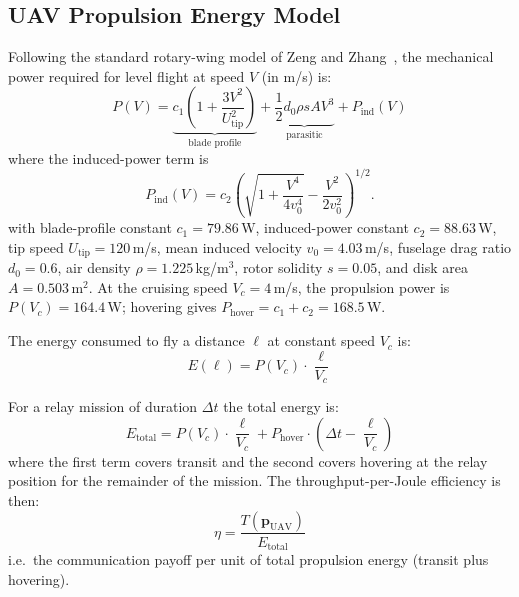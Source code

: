 \documentclass[journal]{IEEEtran}
\begin{document}
\subsection{UAV Propulsion Energy Model}

Following the standard rotary-wing model of Zeng and Zhang~\cite{zeng2017energy}, the mechanical power required for level flight at speed $V$ (in m/s) is:
\begin{equation}
    P(V) = \underbrace{c_1\!\left(1 + \frac{3V^2}{U_\text{tip}^2}\right)}_{\text{blade profile}} + \underbrace{\frac{1}{2}d_0 \rho s A V^3}_{\text{parasitic}} + P_\text{ind}(V)
    \label{eq:propulsion}
\end{equation}
where the induced-power term is
\begin{equation}
    P_\text{ind}(V) = c_2\!\left(\sqrt{1 + \frac{V^4}{4v_0^4}} - \frac{V^2}{2v_0^2}\right)^{\!1/2}.
    \label{eq:induced}
\end{equation}
with blade-profile constant $c_1 = 79.86$\,W, induced-power constant $c_2 = 88.63$\,W, tip speed $U_\text{tip} = 120$\,m/s, mean induced velocity $v_0 = 4.03$\,m/s, fuselage drag ratio $d_0 = 0.6$, air density $\rho = 1.225$\,kg/m$^3$, rotor solidity $s = 0.05$, and disk area $A = 0.503$\,m$^2$. At the cruising speed $V_c = 4$\,m/s, the propulsion power is $P(V_c) = 164.4$\,W; hovering gives $P_\text{hover} = c_1 + c_2 = 168.5$\,W.

The energy consumed to fly a distance $\ell$ at constant speed $V_c$ is:
\begin{equation}
    E(\ell) = P(V_c) \cdot \frac{\ell}{V_c}
    \label{eq:energy}
\end{equation}

For a relay mission of duration $\Delta t$ the total energy is:
\begin{equation}
    E_\text{total} = P(V_c) \cdot \frac{\ell}{V_c} + P_\text{hover} \cdot \left(\Delta t - \frac{\ell}{V_c}\right)
    \label{eq:energy_total}
\end{equation}
where the first term covers transit and the second covers hovering at the relay position for the remainder of the mission. The throughput-per-Joule efficiency is then:
\begin{equation}
    \eta = \frac{T(\mathbf{p}_\text{UAV})}{E_\text{total}}
    \label{eq:efficiency}
\end{equation}
i.e.\ the communication payoff per unit of total propulsion energy (transit plus hovering).


\end{document}
